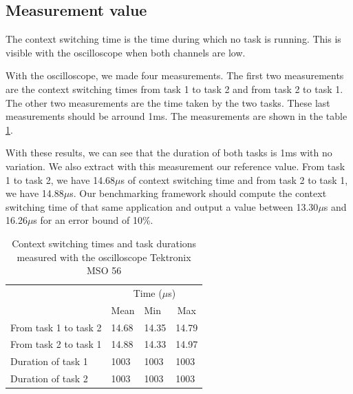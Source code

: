 \subsection{Measurement value}

The context switching time is the time during which no task is running.
This is visible with the oscilloscope when both channels are low.

With the oscilloscope, we made four measurements.
The first two measurements are the context switching times from task 1 to task 2 and from task 2 to task 1.
The other two measurements are the time taken by the two tasks.
These last measurements should be arround 1ms.
The measurements are shown in the table \ref{tab:reference-measurement}.

With these results, we can see that the duration of both tasks is 1ms with no variation.
We also extract with this measurement our reference value.
From task 1 to task 2, we have 14.68$\mu$s of context switching time and from task 2 to task 1, we have 14.88$\mu$s.
Our benchmarking framework should compute the context switching time of that same application and output a value between 13.30$\mu$s and 16.26$\mu$s for an error bound of 10\%.

\begin{table}[!ht]
  \centering
  \begin{tabular}{llll}
                        & \multicolumn{3}{c}{Time ($\mu$s)}                              \\ \cline{2-4} 
                        & \multicolumn{1}{c}{Mean} & Min   & \multicolumn{1}{c}{Max} \\ \cline{2-4} 
  From task 1 to task 2 & 14.68                    & 14.35 & 14.79                   \\
  From task 2 to task 1 & 14.88                    & 14.33 & 14.97                   \\
  Duration of task 1    & 1003                     & 1003  & 1003                    \\
  Duration of task 2    & 1003                     & 1003  & 1003                   
  \end{tabular}
  \caption{Context switching times and task durations measured with the oscilloscope Tektronix MSO 56}
  \label{tab:reference-measurement}
\end{table}